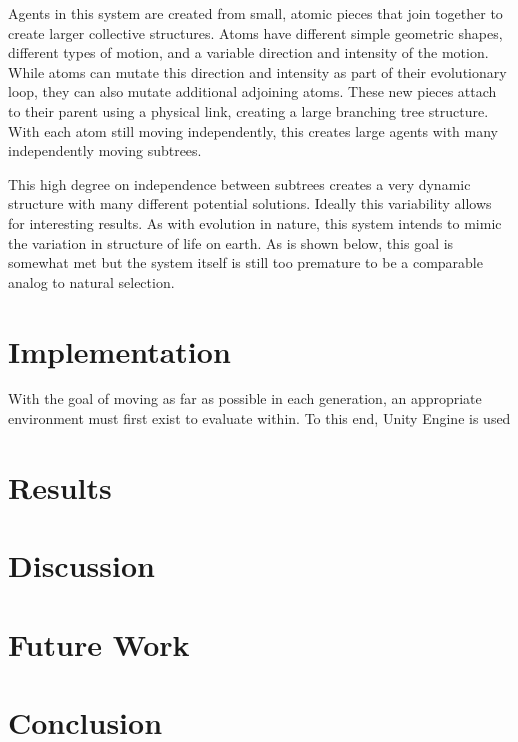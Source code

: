 \documentclass[runningheads]{llncs}
\begin{document}
Agents in this system are created from small, atomic pieces that join together to create larger collective structures.
Atoms have different simple geometric shapes, different types of motion, and a variable direction and intensity of the motion.
While atoms can mutate this direction and intensity as part of their evolutionary loop, they can also mutate additional adjoining atoms.
These new pieces attach to their parent using a physical link, creating a large branching tree structure.
With each atom still moving independently, this creates large agents with many independently moving subtrees.

This high degree on independence between subtrees creates a very dynamic structure with many different potential solutions.
Ideally this variability allows for interesting results.
As with evolution in nature, this system intends to mimic the variation in structure of life on earth.
As is shown below, this goal is somewhat met but the system itself is still too premature to be a comparable analog to natural selection.

\section{Implementation}
With the goal of moving as far as possible in each generation, an appropriate environment must first exist to evaluate within.
To this end, Unity Engine is used 

\section{Results}

\section{Discussion}

\section{Future Work}

\section{Conclusion}
\end{document}
